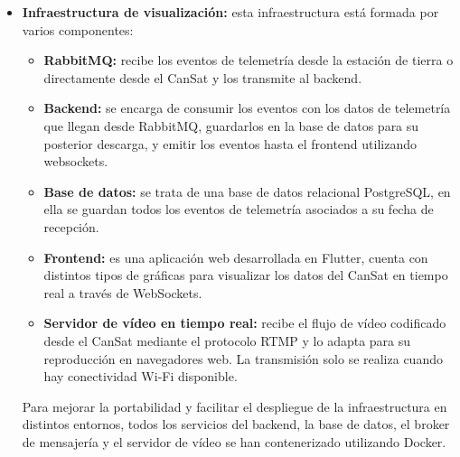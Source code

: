 \begin{itemize}
    \item \textbf{Infraestructura de visualización: } esta infraestructura está formada por varios componentes:
    \begin{itemize}
        \item \textbf{RabbitMQ: } recibe los eventos de telemetría desde la estación de tierra o directamente desde el CanSat y los transmite al backend.
        \item \textbf{Backend: } se encarga de consumir los eventos con los datos de telemetría que llegan desde RabbitMQ,
        guardarlos en la base de datos para su posterior descarga, y emitir los eventos hasta el frontend utilizando websockets.
        \item \textbf{Base de datos: } se trata de una base de datos relacional PostgreSQL, en ella se guardan todos los eventos de telemetría asociados a su fecha de recepción.
        \item \textbf{Frontend: } es una aplicación web desarrollada en Flutter, cuenta con distintos tipos de gráficas para visualizar los datos del CanSat en tiempo real a través de WebSockets.
        \item \textbf{Servidor de vídeo en tiempo real:} recibe el flujo de vídeo codificado desde el CanSat mediante el protocolo RTMP y lo adapta para su reproducción en navegadores web.
        La transmisión solo se realiza cuando hay conectividad Wi‑Fi disponible.
    \end{itemize}
    Para mejorar la portabilidad y facilitar el despliegue de la infraestructura en distintos entornos, todos los servicios del backend, la base de datos, el broker de mensajería y el servidor de vídeo se han contenerizado utilizando Docker.
\end{itemize}
